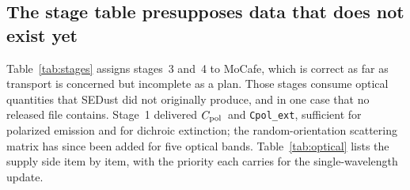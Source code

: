 \documentclass{my_memo}
\newcommand{\code}[1]{\texttt{#1}}
\newcommand{\Cpol}{\ensuremath{C_{\rm pol}}}
\begin{document}
\subsection{The stage table presupposes data that does not exist yet}

Table~\ref{tab:stages} assigns stages~3 and~4 to MoCafe, which is
correct as far as transport is concerned but incomplete as a plan.
Those stages consume optical quantities that SEDust did not originally
produce, and in one case that no released file contains. Stage~1
delivered \Cpol\ and \code{Cpol\_ext}, sufficient for polarized emission
and for dichroic extinction; the random-orientation scattering matrix
has since been added for five optical bands. Table~\ref{tab:optical}
lists the supply side item by item, with the priority each carries for
the single-wavelength update.
\end{document}
